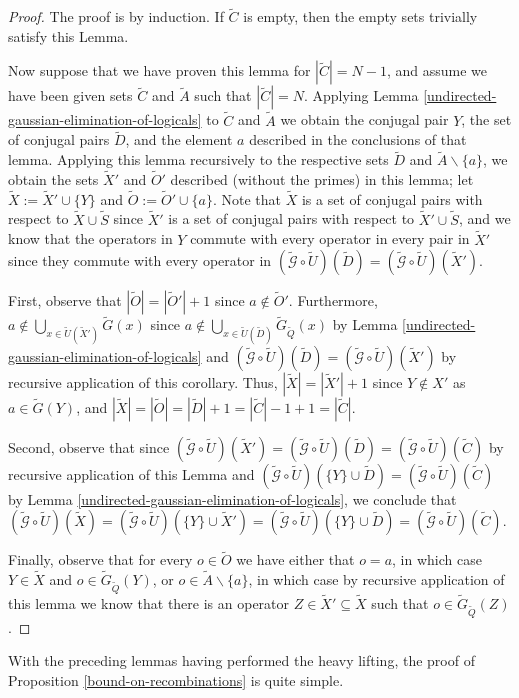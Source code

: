 \documentclass[twocolumn,showpacs,preprintnumbers,amsmath,amssymb,nofootinbib,pra,floatfix]{revtex4-1}
\newenvironment{remark}[1][Remark]{\begin{trivlist}
\item[\hskip \labelsep {\bfseries #1}]}{\end{trivlist}}
\newcommand{\set}{\tilde}
\newcommand{\genfun}{\tilde{\mathcal{G}}}
\begin{document}
\begin{proof}
The proof is by induction.  If $\set C$ is empty, then the empty sets trivially satisfy this Lemma.

Now suppose that we have proven this lemma for $|\set C|=N-1$, and assume we have been given sets $\set C$ and $\set A$ such that $|\set C|=N$.  Applying Lemma \ref{undirected-gaussian-elimination-of-logicals} to $\set C$ and $\set A$ we obtain the conjugal pair $Y$,  the set of conjugal pairs $\set D$, and the element $a$ described in the conclusions of that lemma.  Applying this lemma recursively to the respective sets $\set D$ and $\set A\backslash\{a\}$, we obtain the sets $\set X'$ and $\set O'$ described (without the primes) in this lemma; let $\set X := \set X'\cup\{Y\}$ and $\set O:=\set O'\cup\{a\}$.  Note that $\set X$ is a set of conjugal pairs with respect to $\set X\cup\set S$ since $\set X'$ is a set of conjugal pairs with respect to $\set X'\cup\set S$, and we know that the operators in $Y$ commute with every operator in every pair in $\set X'$ since they commute with every operator in $(\genfun\circ\set U)(\set D)=(\genfun\circ\set U)(\set X')$.

First, observe that $|\set O|=|\set O'|+1$ since $a\notin \set O'$.  Furthermore, $a\notin \bigcup_{x\in \set U(\set X')} \set G(x)$ since $a\notin \bigcup_{x\in \set U(\set D)} \set G_{\set Q}(x)$ by Lemma \ref{undirected-gaussian-elimination-of-logicals} and $(\genfun\circ\set U)(\set D)=(\genfun\circ\set U)(\set X')$ by recursive application of this corollary.  Thus, $|\set X|=|\set X'|+1$ since $Y\notin X'$ as $a\in\set G(Y)$, and $|\set X|=|\set O|=|\set D|+1=|\set C|-1+1=|\set C|$.

Second, observe that since $(\genfun\circ\set U)(\set X')=(\genfun\circ\set U)(\set D)=(\genfun\circ\set U)(\set C)$ by recursive application of this Lemma and $(\genfun\circ\set U)(\{Y\}\cup\set D)=(\genfun\circ\set U)(\set C)$ by Lemma \ref{undirected-gaussian-elimination-of-logicals}, we conclude that $(\genfun\circ\set U)(\set X) = (\genfun\circ\set U)(\{Y\}\cup\set X') = (\genfun\circ\set U)(\{Y\}\cup\set D) = (\genfun\circ\set U)(\set C)$.

Finally, observe that for every $o\in\set O$ we have either that $o=a$, in which case $Y\in\set X$ and $o\in\set G_{\set Q}(Y)$, or $o\in \set A\backslash\{a\}$, in which case by recursive application of this lemma we know that there is an operator $Z\in \set X'\subseteq \set X$ such that $o\in\set G_{\set Q}(Z)$.
\end{proof}
\begin{remark}
With the preceding lemmas having performed the heavy lifting, the proof of Proposition \ref{bound-on-recombinations} is quite simple.
\end{remark}
\end{document}
